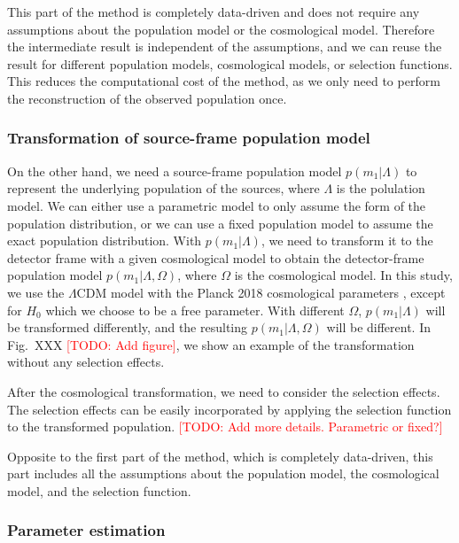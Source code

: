 \documentclass[aps,prd,twocolumn,superscriptaddress,preprintnumbers,nofootinbib,hidelinks]{revtex4-2}
\newcommand{\todo}[1]{\textcolor{red}{[TODO: #1]}}
\begin{document}
This part of the method is completely data-driven and does not require any assumptions about the population model or the cosmological model.
Therefore the intermediate result is independent of the assumptions, and we can reuse the result for different population models, cosmological models, or selection functions.
This reduces the computational cost of the method, as we only need to perform the reconstruction of the observed population once.

\subsubsection{Transformation of source-frame population model}
\label{sec:transformation}

On the other hand, we need a source-frame population model $p(m_1|\Lambda)$ to represent the underlying population of the sources, where $\Lambda$ is the polulation model.
We can either use a parametric model to only assume the form of the population distribution, or we can use a fixed population model to assume the exact population distribution.
With $p(m_1|\Lambda)$, we need to transform it to the detector frame with a given cosmological model to obtain the detector-frame population model $p(m_1|\Lambda, \Omega)$, where $\Omega$ is the cosmological model.
In this study, we use the $\Lambda$CDM model with the Planck 2018 cosmological parameters \citep{Planck:2018vyg}, except for $H_0$ which we choose to be a free parameter.
With different $\Omega$, $p(m_1|\Lambda)$ will be transformed differently, and the resulting $p(m_1|\Lambda, \Omega)$ will be different.
In Fig.~XXX \todo{Add figure}, we show an example of the transformation without any selection effects.

After the cosmological transformation, we need to consider the selection effects.
The selection effects can be easily incorporated by applying the selection function to the transformed population.
\todo{Add more details. Parametric or fixed?}

Opposite to the first part of the method, which is completely data-driven, this part includes all the assumptions about the population model, the cosmological model, and the selection function.

\subsubsection{Parameter estimation}
\label{sec:pe}
\end{document}
